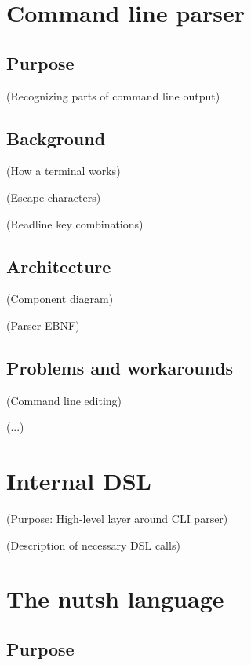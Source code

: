 \documentclass[twoside]{scrreprt}
\begin{document}
\section{Command line parser}

\subsection{Purpose}

                (Recognizing parts of command line output)

\subsection{Background}

                (How a terminal works)

                (Escape characters)

                (Readline key combinations)

\subsection{Architecture}

                (Component diagram)

                (Parser EBNF)

\subsection{Problems and workarounds}

                (Command line editing)

                (...)

\section{Internal DSL}

            (Purpose: High-level layer around CLI parser)

            (Description of necessary DSL calls)

\section{The nutsh language}

\subsection{Purpose}
\end{document}
